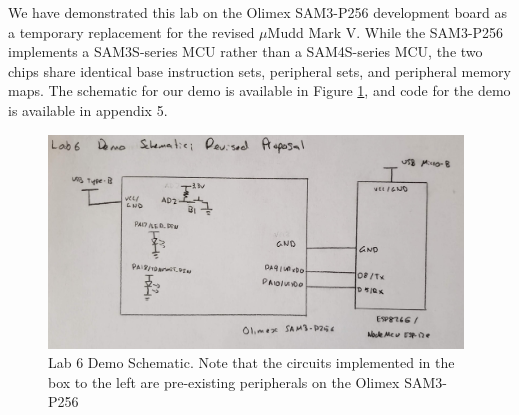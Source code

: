 \documentclass[12pt]{article}
\begin{document}
We have demonstrated this lab on the Olimex SAM3-P256 development board as a temporary replacement for the revised $\mu$Mudd Mark V. While the SAM3-P256 implements a SAM3S-series MCU rather than a SAM4S-series MCU, the two chips share identical base instruction sets, peripheral sets, and peripheral memory maps. The schematic for our demo is available in Figure \ref{lab6schematic}, and code for the demo is available in appendix 5. 

\begin{figure}[h]
    \label{lab6schematic}
	\begin{center}
	\includegraphics[width=11cm]{lab6_schematic.jpg}
	\caption{Lab 6 Demo Schematic. Note that the circuits implemented in the box to the left are pre-existing peripherals on the Olimex SAM3-P256}	
	\end{center}
\end{figure}
\end{document}

